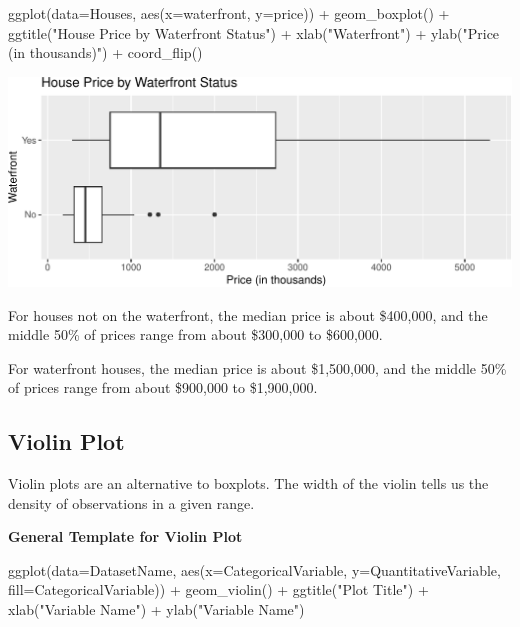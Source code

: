 \documentclass[
  letterpaper,
  DIV=11,
  numbers=noendperiod]{scrreprt}
\newenvironment{Shaded}{\begin{snugshade}}{\end{snugshade}}
\newcommand{\AttributeTok}[1]{\textcolor[rgb]{0.40,0.45,0.13}{#1}}
\newcommand{\FunctionTok}[1]{\textcolor[rgb]{0.28,0.35,0.67}{#1}}
\newcommand{\NormalTok}[1]{\textcolor[rgb]{0.00,0.23,0.31}{#1}}
\newcommand{\SpecialCharTok}[1]{\textcolor[rgb]{0.37,0.37,0.37}{#1}}
\newcommand{\StringTok}[1]{\textcolor[rgb]{0.13,0.47,0.30}{#1}}
\begin{document}
\begin{Shaded}
\begin{Highlighting}[]
\FunctionTok{ggplot}\NormalTok{(}\AttributeTok{data=}\NormalTok{Houses, }\FunctionTok{aes}\NormalTok{(}\AttributeTok{x=}\NormalTok{waterfront, }\AttributeTok{y=}\NormalTok{price)) }\SpecialCharTok{+} \FunctionTok{geom\_boxplot}\NormalTok{() }\SpecialCharTok{+} 
  \FunctionTok{ggtitle}\NormalTok{(}\StringTok{"House Price by Waterfront Status"}\NormalTok{) }\SpecialCharTok{+} 
  \FunctionTok{xlab}\NormalTok{(}\StringTok{"Waterfront"}\NormalTok{) }\SpecialCharTok{+} \FunctionTok{ylab}\NormalTok{(}\StringTok{"Price (in thousands)"}\NormalTok{) }\SpecialCharTok{+} \FunctionTok{coord\_flip}\NormalTok{()}
\end{Highlighting}
\end{Shaded}

\includegraphics{Ch1_files/figure-pdf/unnamed-chunk-19-1.pdf}

For houses not on the waterfront, the median price is about \$400,000,
and the middle 50\% of prices range from about \$300,000 to \$600,000.

For waterfront houses, the median price is about \$1,500,000, and the
middle 50\% of prices range from about \$900,000 to \$1,900,000.

\subsection{Violin Plot}\label{violin-plot}

Violin plots are an alternative to boxplots. The width of the violin
tells us the density of observations in a given range.

\textbf{General Template for Violin Plot}

\begin{Shaded}
\begin{Highlighting}[]
\FunctionTok{ggplot}\NormalTok{(}\AttributeTok{data=}\NormalTok{DatasetName, }\FunctionTok{aes}\NormalTok{(}\AttributeTok{x=}\NormalTok{CategoricalVariable, }\AttributeTok{y=}\NormalTok{QuantitativeVariable, }
                             \AttributeTok{fill=}\NormalTok{CategoricalVariable)) }\SpecialCharTok{+} 
  \FunctionTok{geom\_violin}\NormalTok{() }\SpecialCharTok{+} 
  \FunctionTok{ggtitle}\NormalTok{(}\StringTok{"Plot Title"}\NormalTok{) }\SpecialCharTok{+} 
  \FunctionTok{xlab}\NormalTok{(}\StringTok{"Variable Name"}\NormalTok{) }\SpecialCharTok{+} \FunctionTok{ylab}\NormalTok{(}\StringTok{"Variable Name"}\NormalTok{) }
\end{Highlighting}
\end{Shaded}
\end{document}
